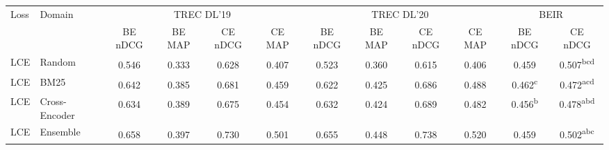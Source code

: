 \begin{table}[t]
  \centering
  \footnotesize
  \setlength{\tabcolsep}{3pt}
  \begin{tabular}{llcccccccccc}
  \toprule
    Loss & Domain & \multicolumn{4}{c}{TREC DL'19} & \multicolumn{4}{c}{TREC DL'20} & \multicolumn{2}{c}{BEIR} \\
  \cmidrule(lr){3-6}\cmidrule(lr){7-10}\cmidrule(lr){11-12}
    &  & BE nDCG & BE MAP & CE nDCG & CE MAP & BE nDCG & BE MAP & CE nDCG & CE MAP & BE nDCG & CE nDCG \\
  \midrule
  LCE & Random & 0.546\textsuperscript{\phantom{aaa}} & 0.333\textsuperscript{\phantom{aaa}} & 0.628\textsuperscript{\phantom{aaa}} & 0.407\textsuperscript{\phantom{aaa}} & 0.523\textsuperscript{\phantom{aaa}} & 0.360\textsuperscript{\phantom{aaa}} & 0.615\textsuperscript{\phantom{aaa}} & 0.406\textsuperscript{\phantom{aaa}} & 0.459\textsuperscript{\phantom{aaa}} & 0.507\textsuperscript{bcd\phantom{}} \\
  LCE & BM25 & 0.642\textsuperscript{\phantom{aaa}} & 0.385\textsuperscript{\phantom{aaa}} & 0.681\textsuperscript{\phantom{aaa}} & 0.459\textsuperscript{\phantom{aaa}} & 0.622\textsuperscript{\phantom{aaa}} & 0.425\textsuperscript{\phantom{aaa}} & 0.686\textsuperscript{\phantom{aaa}} & 0.488\textsuperscript{\phantom{aaa}} & 0.462\textsuperscript{c\phantom{aa}} & 0.472\textsuperscript{acd\phantom{}} \\
  LCE & Cross-Encoder & 0.634\textsuperscript{\phantom{aaa}} & 0.389\textsuperscript{\phantom{aaa}} & 0.675\textsuperscript{\phantom{aaa}} & 0.454\textsuperscript{\phantom{aaa}} & 0.632\textsuperscript{\phantom{aaa}} & 0.424\textsuperscript{\phantom{aaa}} & 0.689\textsuperscript{\phantom{aaa}} & 0.482\textsuperscript{\phantom{aaa}} & 0.456\textsuperscript{b\phantom{aa}} & 0.478\textsuperscript{abd\phantom{}} \\
  LCE & Ensemble & 0.658\textsuperscript{\phantom{aaa}} & 0.397\textsuperscript{\phantom{aaa}} & 0.730\textsuperscript{\phantom{aaa}} & 0.501\textsuperscript{\phantom{aaa}} & 0.655\textsuperscript{\phantom{aaa}} & 0.448\textsuperscript{\phantom{aaa}} & 0.738\textsuperscript{\phantom{aaa}} & 0.520\textsuperscript{\phantom{aaa}} & 0.459\textsuperscript{\phantom{aaa}} & 0.502\textsuperscript{abc\phantom{}} \\

\end{tabular}
\end{table}
